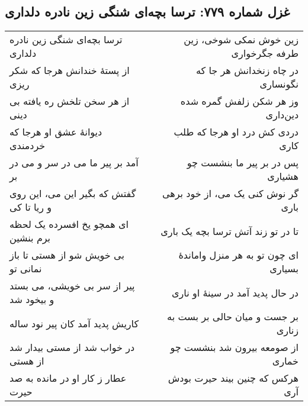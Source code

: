 \begin{center}
\section*{غزل شماره ۷۷۹: ترسا بچه‌ای شنگی زین نادره دلداری}
\label{sec:779}
\begin{longtable}{l p{0.5cm} r}
ترسا بچه‌ای شنگی زین نادره دلداری
&&
زین خوش نمکی شوخی، زین طرفه جگرخواری
\\
از پستهٔ خندانش هرجا که شکر ریزی
&&
در چاه زنخدانش هر جا که نگونساری
\\
از هر سخن تلخش ره یافته بی دینی
&&
وز هر شکن زلفش گمره شده دین‌داری
\\
دیوانهٔ عشق او هرجا که خردمندی
&&
دردی کش درد او هرجا که طلب کاری
\\
آمد بر پیر ما می در سر و می در بر
&&
پس در بر پیر ما بنشست چو هشیاری
\\
گفتش که بگیر این می، این روی و ریا تا کی
&&
گر نوش کنی یک می، از خود برهی باری
\\
ای همچو یخ افسرده یک لحظه برم بنشین
&&
تا در تو زند آتش ترسا بچه یک باری
\\
بی خویش شو از هستی تا باز نمانی تو
&&
ای چون تو به هر منزل واماندهٔ بسیاری
\\
پیر از سر بی خویشی، می بستد و بیخود شد
&&
در حال پدید آمد در سینهٔ او ناری
\\
کاریش پدید آمد کان پیر نود ساله
&&
بر جست و میان حالی بر بست به زناری
\\
در خواب شد از مستی بیدار شد از هستی
&&
از صومعه بیرون شد بنشست چو خماری
\\
عطار ز کار او در مانده به صد حیرت
&&
هرکس که چنین بیند حیرت بودش آری
\\
\end{longtable}
\end{center}
